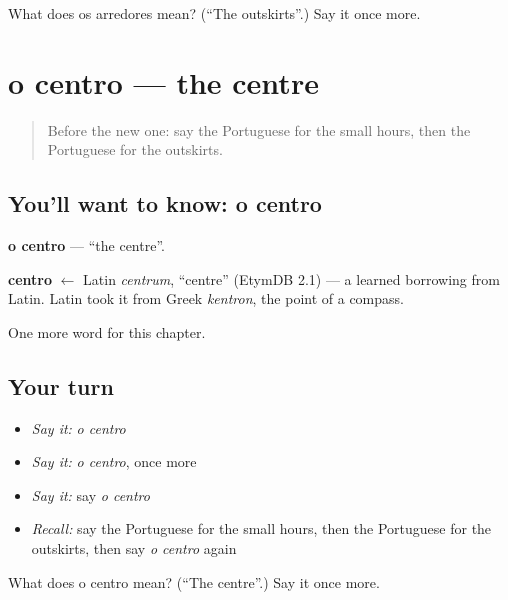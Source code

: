 \begin{tcolorbox}[breakable,colback=teal!4,colframe=teal!35!black,title={Before you move on}]
What does os arredores mean? (\textquotedblleft{}The outskirts\textquotedblright{}.) Say it once more.
\end{tcolorbox}
\section[o centro]{o centro — the centre}

\label{lesson:PT-C183-centro}



\begin{quote}
Before the new one: say the Portuguese for the small hours, then the Portuguese for the outskirts.
\end{quote}

\subsection*{You'll want to know: o centro}
\textbf{o centro} — \textquotedblleft{}the centre\textquotedblright{}.

\begin{cousinweb}
\textbf{centro} $\leftarrow$ Latin \emph{centrum}, \textquotedblleft{}centre\textquotedblright{} (EtymDB 2.1) — a learned borrowing from Latin. Latin took it from Greek \emph{kentron}, the point of a compass.
\end{cousinweb}

\begin{grammarlens}[title={What you've built}]
One more word for this chapter.
\end{grammarlens}

\subsection*{Your turn}
\begin{itemize}
\raggedright
  \item \emph{Say it:} \emph{o centro}
  \item \emph{Say it:} \emph{o centro}, once more
  \item \emph{Say it:} say \emph{o centro}
  \item \emph{Recall:} say the Portuguese for the small hours, then the Portuguese for the outskirts, then say \emph{o centro} again
\end{itemize}

\begin{tcolorbox}[breakable,colback=teal!4,colframe=teal!35!black,title={Before you move on}]
What does o centro mean? (\textquotedblleft{}The centre\textquotedblright{}.) Say it once more.
\end{tcolorbox}
